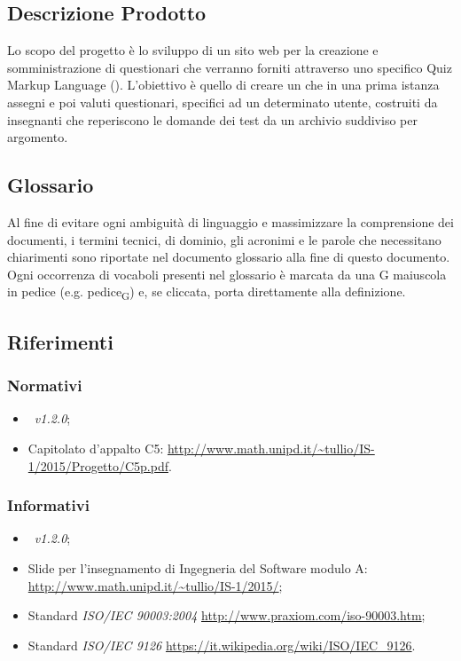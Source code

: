 \documentclass[12pt,a4paper]{article}
\begin{document}
\subsection{Descrizione Prodotto}
Lo scopo del progetto è lo sviluppo di un sito web per la creazione e somministrazione di questionari che verranno forniti attraverso uno specifico Quiz Markup Language (). L'obiettivo è quello di creare un  che in una prima istanza assegni e poi valuti questionari, specifici ad un determinato utente, costruiti da insegnanti che reperiscono le domande dei test da un archivio suddiviso per argomento.

\subsection{Glossario}
Al fine di evitare ogni ambiguità di linguaggio e massimizzare la comprensione dei documenti, i termini tecnici, di dominio, gli acronimi e le parole che necessitano chiarimenti sono riportate nel documento glossario alla fine di questo documento. Ogni occorrenza di vocaboli presenti nel glossario è marcata da una G maiuscola in pedice (e.g. pedice\textsubscript{G}) e, se cliccata, porta direttamente alla definizione.

\subsection{Riferimenti}

\subsubsection{Normativi}
\begin{itemize}
	\item \NdP\ \textit{v1.2.0};
    \item Capitolato d'appalto C5: \url{http://www.math.unipd.it/~tullio/IS-1/2015/Progetto/C5p.pdf}.
\end{itemize}

\subsubsection{Informativi}
\begin{itemize}
	\item \PdP\ \textit{v1.2.0};
    \item Slide per l'insegnamento di Ingegneria del Software modulo A: \url{http://www.math.unipd.it/~tullio/IS-1/2015/};
	\item Standard \textit{ISO/IEC 90003:2004} \url{http://www.praxiom.com/iso-90003.htm};
	\item Standard \textit{ISO/IEC 9126} \url{https://it.wikipedia.org/wiki/ISO/IEC_9126}.
\end{itemize}
\newpage
\end{document}
